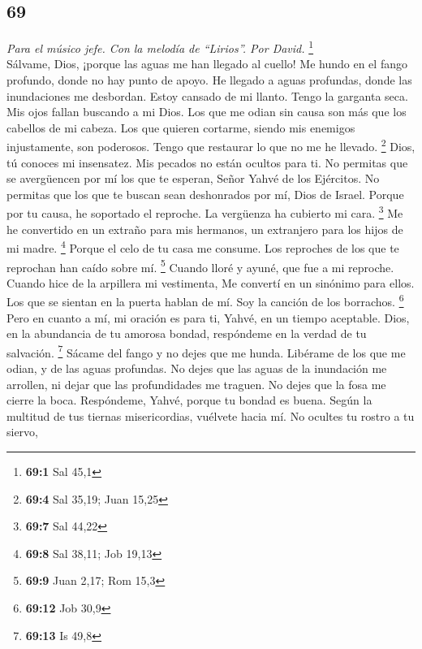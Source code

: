 \begin{paracol}{2}
\hypertarget{section-136}{%
\section{69}\label{section-136}}

\emph{Para el músico jefe. Con la melodía de ``Lirios''. Por David.}
\footnote{\textbf{69:1} Sal 45,1}\\
 Sálvame, Dios, ¡porque las aguas me han llegado al
cuello!  Me hundo en el fango profundo, donde no hay punto
de apoyo. He llegado a aguas profundas, donde las inundaciones me
desbordan.  Estoy cansado de mi llanto. Tengo la garganta
seca. Mis ojos fallan buscando a mi Dios.  Los que me
odian sin causa son más que los cabellos de mi cabeza. Los que quieren
cortarme, siendo mis enemigos injustamente, son poderosos. Tengo que
restaurar lo que no me he llevado. \footnote{\textbf{69:4} Sal 35,19;
  Juan 15,25}  Dios, tú conoces mi insensatez. Mis pecados
no están ocultos para ti.  No permitas que se avergüencen
por mí los que te esperan, Señor Yahvé de los Ejércitos. No permitas que
los que te buscan sean deshonrados por mí, Dios de Israel.
 Porque por tu causa, he soportado el reproche. La
vergüenza ha cubierto mi cara. \footnote{\textbf{69:7} Sal 44,22}
 Me he convertido en un extraño para mis hermanos, un
extranjero para los hijos de mi madre. \footnote{\textbf{69:8} Sal
  38,11; Job 19,13}  Porque el celo de tu casa me consume.
Los reproches de los que te reprochan han caído sobre mí. \footnote{\textbf{69:9}
  Juan 2,17; Rom 15,3}  Cuando lloré y ayuné, que fue a
mi reproche.  Cuando hice de la arpillera mi vestimenta,
Me convertí en un sinónimo para ellos.  Los que se
sientan en la puerta hablan de mí. Soy la canción de los borrachos.
\footnote{\textbf{69:12} Job 30,9}  Pero en cuanto a mí,
mi oración es para ti, Yahvé, en un tiempo aceptable. Dios, en la
abundancia de tu amorosa bondad, respóndeme en la verdad de tu
salvación. \footnote{\textbf{69:13} Is 49,8}  Sácame del
fango y no dejes que me hunda. Libérame de los que me odian, y de las
aguas profundas.  No dejes que las aguas de la inundación
me arrollen, ni dejar que las profundidades me traguen. No dejes que la
fosa me cierre la boca.  Respóndeme, Yahvé, porque tu
bondad es buena. Según la multitud de tus tiernas misericordias,
vuélvete hacia mí.  No ocultes tu rostro a tu siervo,

\end{paracol}
